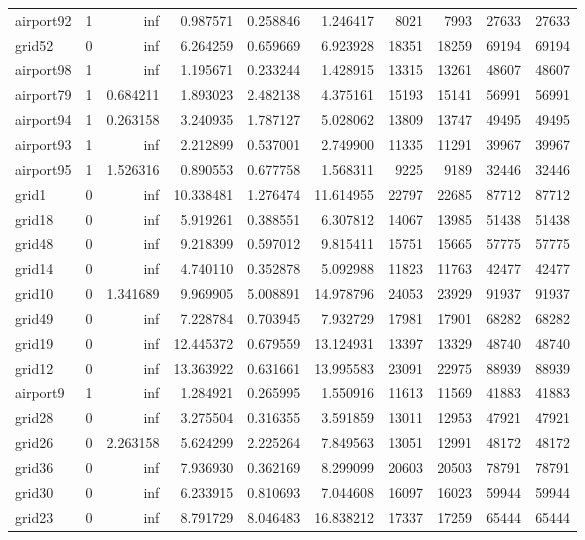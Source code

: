 \begin{longtable}{|l|r|r|r|r|r|r|r|r|r|}
airport92 & 1 & inf & 0.987571 & 0.258846 & 1.246417 & 8021 & 7993 & 27633 & 27633 \\
grid52 & 0 & inf & 6.264259 & 0.659669 & 6.923928 & 18351 & 18259 & 69194 & 69194 \\
airport98 & 1 & inf & 1.195671 & 0.233244 & 1.428915 & 13315 & 13261 & 48607 & 48607 \\
airport79 & 1 & 0.684211 & 1.893023 & 2.482138 & 4.375161 & 15193 & 15141 & 56991 & 56991 \\
airport94 & 1 & 0.263158 & 3.240935 & 1.787127 & 5.028062 & 13809 & 13747 & 49495 & 49495 \\
airport93 & 1 & inf & 2.212899 & 0.537001 & 2.749900 & 11335 & 11291 & 39967 & 39967 \\
airport95 & 1 & 1.526316 & 0.890553 & 0.677758 & 1.568311 & 9225 & 9189 & 32446 & 32446 \\
grid1 & 0 & inf & 10.338481 & 1.276474 & 11.614955 & 22797 & 22685 & 87712 & 87712 \\
grid18 & 0 & inf & 5.919261 & 0.388551 & 6.307812 & 14067 & 13985 & 51438 & 51438 \\
grid48 & 0 & inf & 9.218399 & 0.597012 & 9.815411 & 15751 & 15665 & 57775 & 57775 \\
grid14 & 0 & inf & 4.740110 & 0.352878 & 5.092988 & 11823 & 11763 & 42477 & 42477 \\
grid10 & 0 & 1.341689 & 9.969905 & 5.008891 & 14.978796 & 24053 & 23929 & 91937 & 91937 \\
grid49 & 0 & inf & 7.228784 & 0.703945 & 7.932729 & 17981 & 17901 & 68282 & 68282 \\
grid19 & 0 & inf & 12.445372 & 0.679559 & 13.124931 & 13397 & 13329 & 48740 & 48740 \\
grid12 & 0 & inf & 13.363922 & 0.631661 & 13.995583 & 23091 & 22975 & 88939 & 88939 \\
airport9 & 1 & inf & 1.284921 & 0.265995 & 1.550916 & 11613 & 11569 & 41883 & 41883 \\
grid28 & 0 & inf & 3.275504 & 0.316355 & 3.591859 & 13011 & 12953 & 47921 & 47921 \\
grid26 & 0 & 2.263158 & 5.624299 & 2.225264 & 7.849563 & 13051 & 12991 & 48172 & 48172 \\
grid36 & 0 & inf & 7.936930 & 0.362169 & 8.299099 & 20603 & 20503 & 78791 & 78791 \\
grid30 & 0 & inf & 6.233915 & 0.810693 & 7.044608 & 16097 & 16023 & 59944 & 59944 \\
grid23 & 0 & inf & 8.791729 & 8.046483 & 16.838212 & 17337 & 17259 & 65444 & 65444 \\

\end{longtable}
